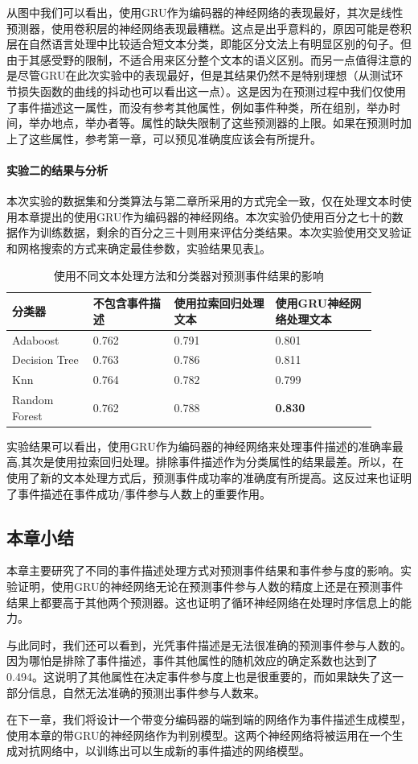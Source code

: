 从图中我们可以看出，使用GRU作为编码器的神经网络的表现最好，其次是线性预测器，使用卷积层的神经网络表现最糟糕。这点是出乎意料的，原因可能是卷积层在自然语言处理中比较适合短文本分类，即能区分文法上有明显区别的句子。但由于其感受野的限制，不适合用来区分整个文本的语义区别。而另一点值得注意的是尽管GRU在此次实验中的表现最好，但是其结果仍然不是特别理想（从测试环节损失函数的曲线的抖动也可以看出这一点）。这是因为在预测过程中我们仅使用了事件描述这一属性，而没有参考其他属性，例如事件种类，所在组别，举办时间，举办地点，举办者等。属性的缺失限制了这些预测器的上限。如果在预测时加上了这些属性，参考第一章，可以预见准确度应该会有所提升。 
\paragraph{实验二的结果与分析}\label{train_discrimiator}
本次实验的数据集和分类算法与第二章所采用的方式完全一致，仅在处理文本时使用本章提出的使用GRU作为编码器的神经网络。本次实验仍使用百分之七十的数据作为训练数据，剩余的百分之三十则用来评估分类结果。本次实验使用交叉验证和网格搜索的方式来确定最佳参数，实验结果见表\ref{t2-2}。

\begin{table}[htb] 
    \centering
    \caption{\label{t2-2}使用不同文本处理方法和分类器对预测事件结果的影响}
    \begin{tabular*}{\linewidth}{p{0.2\linewidth}p{0.2\linewidth}p{0.25\linewidth}p{0.25\linewidth}}
\toprule 
分类器&不包含事件描述&使用拉索回归处理文本&使用GRU神经网络处理文本\\
\midrule
Adaboost & 0.762 & 0.791 & 0.801 \\
Decision Tree& 0.763 & 0.786 & 0.811\\
Knn & 0.764 & 0.782 & 0.799 \\
Random Forest & 0.762 & 0.788 & \textbf{0.830} \\
\bottomrule
    \end{tabular*}
\end{table}

实验结果可以看出，使用$\mathrm{GRU}$作为编码器的神经网络来处理事件描述的准确率最高,其次是使用拉索回归处理。排除事件描述作为分类属性的结果最差。所以，在使用了新的文本处理方式后，预测事件成功率的准确度有所提高。这反过来也证明了事件描述在事件成功/事件参与人数上的重要作用。
\subsection{本章小结}
本章主要研究了不同的事件描述处理方式对预测事件结果和事件参与度的影响。实验证明，使用GRU的神经网络无论在预测事件参与人数的精度上还是在预测事件结果上都要高于其他两个预测器。这也证明了循环神经网络在处理时序信息上的能力。

与此同时，我们还可以看到，光凭事件描述是无法很准确的预测事件参与人数的。因为哪怕是排除了事件描述，事件其他属性的随机效应的确定系数也达到了0.494。这说明了其他属性在决定事件参与度上也是很重要的，而如果缺失了这一部分信息，自然无法准确的预测出事件参与人数来。

在下一章，我们将设计一个带变分编码器的端到端的网络作为事件描述生成模型，使用本章的带GRU的神经网络作为判别模型。这两个神经网络将被运用在一个生成对抗网络中，以训练出可以生成新的事件描述的网络模型。
%  